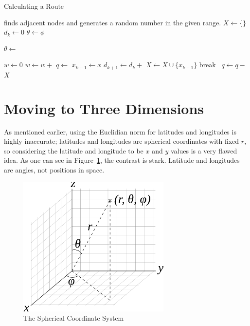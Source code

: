 \documentclass[twocolumn,11pt]{article}
\begin{document}
\begin{algorithm}[t!]
  \caption{Calculating a Route} \label{alg:grow}
  \begin{algorithmic}
    \Require {} finds adjacent nodes and  generates
    a random number in the given range.
    \State $X \gets \{\}$ 
    \State $d_k \gets 0$
    \State $\theta \gets \phi$

      \State $\theta \gets$ 

      \State $w \gets 0$ 
        \State $w \gets w +$
      \EndFor
      \State $q \gets$  
          \State $x_{k+1} \gets x$
          \State $d_{k+1} \gets d_k +$
          \State $X \gets X \cup \{x_{k+1}\}$
          \State break
        \Else~$q \gets q -$
        \EndIf
      \EndFor
    \EndWhile
    \State \Return $X$
  \EndFunction

  \end{algorithmic}
\end{algorithm}

\section{Moving to Three Dimensions} \label{sec:latlong}

As mentioned earlier, using the Euclidian norm for latitudes and longitudes
is highly inaccurate; latitudes and longitudes are spherical coordinates with
fixed $r$, so considering the latitude and longitude to be $x$ and $y$ values is
a very flawed idea. As one can see in Figure~\ref{fig:sphere}, the contrast is
stark. Latitude and longitudes are angles, not positions in space.

\begin{figure}
  \includegraphics[width=3in]{images/558px-3D_Spherical.png}
  \caption{The Spherical Coordinate System} \label{fig:sphere}
\end{figure}
\end{document}
